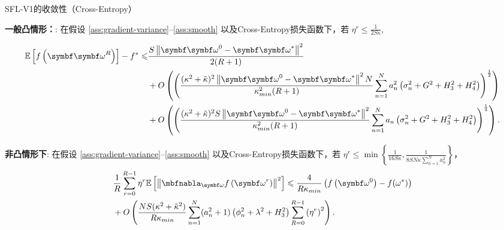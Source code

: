 \begin{theorem}{SFL-V1的收敛性（Cross-Entropy）}\label{theorem-v1-full-ce}

\noindent \textbf{一般凸情形：}:  在假设 \ref{ass:gradient-variance}--\ref{ass:smooth} 以及Cross-Entropy损失函数下，若 $\eta^r \leq \frac{1}{2 S\kappa}$, 

\begin{equation}\label{bound-v1-gc-full-ce}
\begin{aligned}
\mathbb{E}\left[f\left(\boldsymbol{\omegab}^{R}\right)\right]-f^*\le &\frac{S\left\|\boldsymbol{\omegab}^{0}-\boldsymbol{\omegab}^{\ast}\right\|^2}{2(R+1)}\\ 
&+ O\left(\left(\frac{(\kappa^2+\tilde{\kappa})^2\left\|\boldsymbol{\omegab}^{0}-\boldsymbol{\omegab}^{\ast}\right\|^2 N}{\kappa_{min}^2(R+1)}\sum_{n=1}^Na_n^2\left(\sigma_n^2+G^2+H_3^2+H_4^2\right)\right)^{\frac{1}{2}}\right)\\
    &+O\left(\left(\frac{(\kappa^2+\tilde{\kappa})^2S \left\|\boldsymbol{\omegab}^{0}-\boldsymbol{\omegab}^{\ast}\right\|^2}{\kappa_{min}^2(R+1)}\sum_{n=1}^Na_n\left(\sigma_n^2+G^2+H_3^2+H_4^2\right)\right)^{\frac{1}{3}}\right).
\end{aligned}
\end{equation}

\noindent \textbf{非凸情形下}: 在假设 \ref{ass:gradient-variance}--\ref{ass:smooth} 以及Cross-Entropy损失函数下，若 
$\eta^r \leq \min\left\{ \frac{1}{16S\kappa},  \frac{1}{8SN\kappa\sum_{n=1}^Na_n^2}\right\}$，
\begin{equation}\label{bound-v1-nc-full-ce}
\begin{aligned}
&\frac{1}{R}\sum_{r=0}^{R-1}\eta^r\mathbb{E}\left[\left\Vert
\nabla_{\omegab}f\left(\omegab^{r}\right)\right\Vert^2\right]\leq \frac{4}{R\kappa_{min}}\left(f\left(\omegab^{0}\right)-f(\omega^*)\right)\\
&+O\left(\frac{NS(\kappa^2+\tilde{\kappa}^2)}{R\kappa_{min}} \sum_{n=1}^N(a_n^2+1)\left(\phi_n^2+\lambda^2+H_3^2\right)\sum_{R=0}^{R-1}\left(\eta^r\right)^2\right).
\end{aligned}
\end{equation}
\end{theorem}

